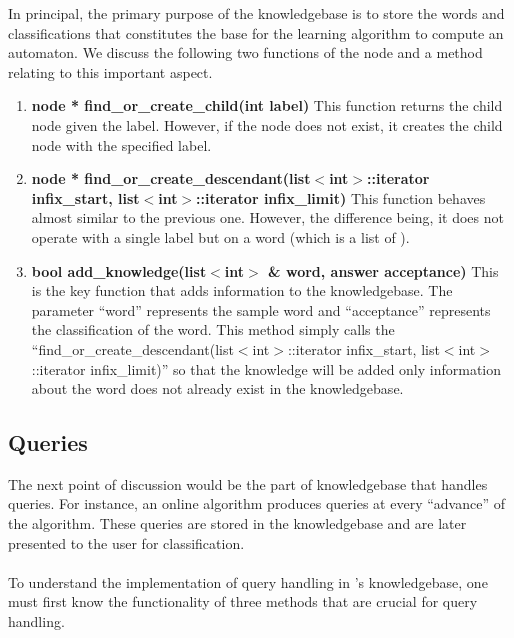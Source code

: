 	In principal, the primary purpose of the knowledgebase is to store the words and classifications that constitutes the base for the learning algorithm to compute an automaton. We discuss the following two functions of the node and a method relating to this important aspect.
\begin{enumerate}
\item \textbf{node * find\_or\_create\_child(int label)} \hfill \vskip 1pt
	This function returns the child node given the label. However, if the node does not exist, it creates the child node with the specified label.
	
\item \textbf{node * find\_or\_create\_descendant(list$<$int$>$::iterator infix\_start, list$<$int$>$::iterator infix\_limit)} \hfill \vskip 1pt
	This function behaves almost similar to the previous one. However, the difference being, it does not operate with a single label but on a word (which is a list of \integer). 
	
\item \textbf{bool add\_knowledge(list$<$int$>$ \& word, answer acceptance)} \hfill \vskip 1pt
	This is the key function that adds information to the knowledgebase. The parameter ``word'' represents the sample word and ``acceptance'' represents the classification of the word. 
	This method simply calls the ``find\_or\_create\_descendant(list$<$int$>$::iterator infix\_start, list$<$int$>$::iterator infix\_limit)'' so that the knowledge will be added only information about the word does not already exist in the knowledgebase.
\end{enumerate}	

\subsection{Queries}

	The next point of discussion would be the part of knowledgebase that handles queries. For instance, an online algorithm produces queries at every ``advance'' of the algorithm. These queries are stored in the knowledgebase and are later presented to the user for classification.
\paragraph{}
	To understand the implementation of query handling in \libalf's knowledgebase, one must first know the functionality of three methods that are crucial for query handling.

